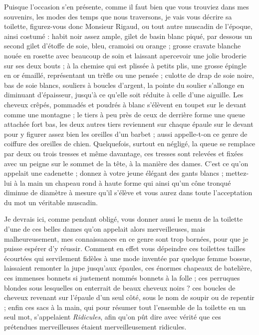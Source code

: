 \documentclass[11pt,a4paper]{report}
\begin{document}
Puisque l'occasion s'en présente, comme il faut bien que vous trouviez dans mes
souvenirs, les modes des temps que nous traversons, je vais vous décrire sa
toilette, figurez-vous donc Monsieur Rigaud, ou tout autre muscadin de l'époque,
ainsi costumé : habit noir assez ample, gilet de basin blanc piqué, par dessous
un second gilet d'étoffe de soie, bleu, cramoisi ou orange ; grosse cravate
blanche nouée en rosette avec beaucoup de soin et laissant apercevoir une jolie
broderie sur ses deux bouts ; à la chemise qui est plissée à petits plis, une
grosse épingle en or émaillé, représentant un trèfle ou une pensée ; culotte de
drap de soie noire, bas de soie blancs, souliers à boucles d'argent, la pointe
du soulier s'allonge en diminuant d'épaisseur, jusqu'à ce qu'elle soit réduite à
celle d'une aiguille. Les cheveux crêpés, pommadés et poudrés à blanc s'élèvent
en toupet sur le devant comme une montagne ; le tiers à peu près de ceux de
derrière forme une queue attachée fort bas, les deux autres tiers reviennent sur
chaque épaule sur le devant pour y figurer assez bien les oreilles d'un barbet ;
aussi appelle-t-on ce genre de coiffure des oreilles de chien. Quelquefois,
surtout en négligé, la queue se remplace par deux ou trois tresses et même
davantage, ces tresses sont relevées et fixées avec un peigne sur le sommet de
la tête, à la manière des dames. C'est ce qu'on appelait une cadenette ; donnez
à votre jeune élégant des gants blancs ; mettez-lui à la main un chapeau rond à
haute forme qui ainsi qu'un cône tronqué diminue de diamètre à mesure qu'il
s'élève et vous aurez dans toute l'acceptation du mot un véritable muscadin.

Je devrais ici, comme pendant obligé, vous donner aussi le menu de la toilette
d'une de ces belles dames qu'on appelait alors merveilleuses, mais
malheureusement, mes connaissances en ce genre sont trop bornées, pour que je
puisse espérer d'y réussir. Comment en effet vous dépeindre ces toilettes
tailles écourtées qui servilement fidèles à une mode inventée par quelque femme
bossue, laissaient remonter la jupe jusqu'aux épaules, ces énormes chapeaux de
batelière, ces immenses bonnets si justement nommés bonnets à la folle ; ces
perruques blondes sous lesquelles on enterrait de beaux cheveux noirs ? ces
boucles de cheveux revenant sur l'épaule d'un seul côté, sous le nom de soupir
ou de repentir ; enfin ces sacs à la main, qui pour résumer tout l'ensemble de
la toilette en un seul mot, s'appelaient \textit{Ridicules}, afin qu'on pût dire
avec vérité que ces prétendues merveilleuses étaient merveilleusement ridicules.
\end{document}
